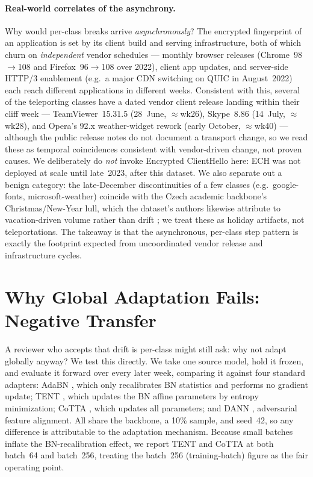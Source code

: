\paragraph{Real-world correlates of the asynchrony.} Why would per-class breaks
arrive \emph{asynchronously}? The encrypted fingerprint of an application is set
by its client build and serving infrastructure, both of which churn on
\emph{independent} vendor schedules --- monthly browser releases (Chrome~98$\to$108
and Firefox~96$\to$108 over 2022), client app updates, and server-side HTTP/3
enablement (e.g.\ a major CDN switching on QUIC in August~2022) each reach
different applications in different weeks. Consistent with this, several of the
teleporting classes have a dated vendor client release landing within their cliff
week --- TeamViewer~15.31.5 (28~June, $\approx$wk26), Skype~8.86 (14~July,
$\approx$wk28), and Opera's 92.x weather-widget rework (early October,
$\approx$wk40) --- although the public release notes do not document a transport
change, so we read these as temporal coincidences consistent with vendor-driven
change, not proven causes. We deliberately do \emph{not} invoke Encrypted
ClientHello here: ECH was not deployed at scale until late~2023, after this
dataset. We also separate out a benign category: the late-December discontinuities
of a few classes (e.g.\ google-fonts, microsoft-weather) coincide with the
Czech academic backbone's Christmas/New-Year lull, which the dataset's authors
likewise attribute to vacation-driven volume rather than drift
\cite{hynek2024cesnet}; we treat these as holiday artifacts, not teleportations.
The takeaway is that the asynchronous, per-class step pattern is exactly the
footprint expected from uncoordinated vendor release and infrastructure cycles.

\section{Why Global Adaptation Fails: Negative Transfer}
\label{sec:negtransfer}

A reviewer who accepts that drift is per-class might still ask: why not adapt
globally anyway? We test this directly. We take one source model, hold it frozen,
and evaluate it forward over every later week, comparing it against four standard
adapters: AdaBN \cite{li2016adabn}, which only recalibrates BN statistics and
performs no gradient update; TENT \cite{wang2020tent}, which updates the BN affine
parameters by entropy minimization; CoTTA \cite{wang2022cotta}, which updates all
parameters; and DANN \cite{ganin2016dann}, adversarial feature alignment. All
share the backbone, a 10\% sample, and seed~42, so any difference is attributable
to the adaptation mechanism. Because small batches inflate the BN-recalibration
effect, we report TENT and CoTTA at both batch~64 and batch~256, treating the
batch~256 (training-batch) figure as the fair operating point.


